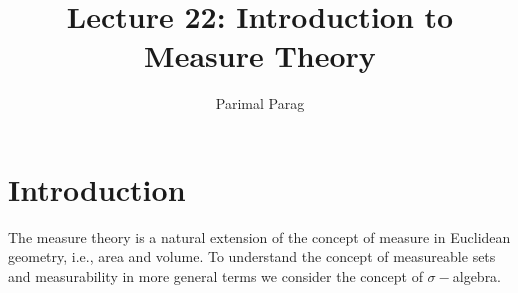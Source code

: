 \documentclass[a4paper,english,12pt]{article}   	%
\title{Lecture 22: Introduction to Measure Theory}
\author{Parimal Parag}
\date{}							%
\begin{document}
\maketitle
\section{Introduction}
The measure theory is a natural extension of the concept of measure in Euclidean geometry, i.e., area and volume. To understand the concept of measureable sets and measurability in more general terms we consider the concept of $\sigma-$algebra. 
\end{document}
